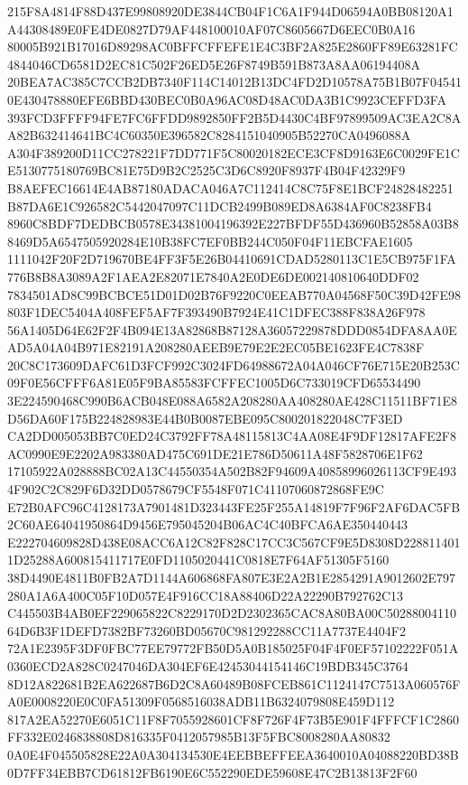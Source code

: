 \documentclass[UTF8,fontset=fandol,zihao=-4,a4paper]{ctexart}
\begin{document}
{{215F8A4814F88D437E99808920DE3844CB04F1C6A1F944D06594A0BB08120A1A44308489E0FE4DE0827D79AF448100010AF07C8605667D6EEC0B0A16
80005B921B17016D89298AC0BFFCFFEFE1E4C3BF2A825E2860FF89E63281FC4844046CD6581D2EC81C502F26ED5E26F8749B591B873A8AA06194408A
20BEA7AC385C7CCB2DB7340F114C14012B13DC4FD2D10578A75B1B07F045410E430478880EFE6BBD430BEC0B0A96AC08D48AC0DA3B1C9923CEFFD3FA
393FCD3FFFF94FE7FC6FFDD9892850FF2B5D4430C4BF97899509AC3EA2C8AA82B632414641BC4C60350E396582C8284151040905B52270CA0496088A
A304F389200D11CC278221F7DD771F5C80020182ECE3CF8D9163E6C0029FE1CE5130775180769BC81E75D9B2C2525C3D6C8920F8937F4B04F42329F9
B8AEFEC16614E4AB87180ADACA046A7C112414C8C75F8E1BCF24828482251B87DA6E1C926582C5442047097C11DCB2499B089ED8A6384AF0C8238FB4
8960C8BDF7DEDBCB0578E34381004196392E227BFDF55D436960B52858A03B88469D5A6547505920284E10B38FC7EF0BB244C050F04F11EBCFAE1605
1111042F20F2D719670BE4FF3F5E26B04410691CDAD5280113C1E5CB975F1FA776B8B8A3089A2F1AEA2E82071E7840A2E0DE6DE002140810640DDF02
7834501AD8C99BCBCE51D01D02B76F9220C0EEAB770A04568F50C39D42FE98803F1DEC5404A408FEF5AF7F393490B7924E41C1DFEC388F838A26F978
56A1405D64E62F2F4B094E13A82868B87128A36057229878DDD0854DFA8AA0EAD5A04A04B971E82191A208280AEEB9E79E2E2EC05BE1623FE4C7838F
20C8C173609DAFC61D3FCF992C3024FD64988672A04A046CF76E715E20B253C09F0E56CFFF6A81E05F9BA85583FCFFEC1005D6C733019CFD65534490
3E224590468C990B6ACB048E088A6582A208280AA408280AE428C11511BF71E8D56DA60F175B224828983E44B0B0087EBE095C800201822048C7F3ED
CA2DD005053BB7C0ED24C3792FF78A48115813C4AA08E4F9DF12817AFE2F8AC0990E9E2202A983380AD475C691DE21E786D50611A48F5828706E1F62
17105922A028888BC02A13C44550354A502B82F94609A40858996026113CF9E4934F902C2C829F6D32DD0578679CF5548F071C41107060872868FE9C
E72B0AFC96C4128173A7901481D323443FE25F255A14819F7F96F2AF6DAC5FB2C60AE64041950864D9456E795045204B06AC4C40BFCA6AE350440443
E222704609828D438E08ACC6A12C82F828C17CC3C567CF9E5D8308D2288114011D25288A600815411717E0FD1105020441C0818E7F64AF51305F5160
38D4490E4811B0FB2A7D1144A606868FA807E3E2A2B1E2854291A9012602E797280A1A6A400C05F10D057E4F916CC18A88406D22A22290B792762C13
C445503B4AB0EF229065822C8229170D2D2302365CAC8A80BA00C5028800411064D6B3F1DEFD7382BF73260BD05670C981292288CC11A7737E4404F2
72A1E2395F3DF0FBC77EE79772FB50D5A0B185025F04F4F0EF57102222F051A0360ECD2A828C0247046DA304EF6E42453044154146C19BDB345C3764
8D12A822681B2EA622687B6D2C8A60489B08FCEB861C1124147C7513A060576FA0E0008220E0C0FA51309F0568516038ADB11B6324079808E459D112
817A2EA52270E6051C11F8F7055928601CF8F726F4F73B5E901F4FFFCF1C2860FF332E0246838808D816335F0412057985B13F5FBC8008280AA80832
0A0E4F045505828E22A0A304134530E4EEBBEFFEEA3640010A04088220BD38B0D7FF34EBB7CD61812FB6190E6C552290EDE59608E47C2B13813F2F60
}}
\end{document}
